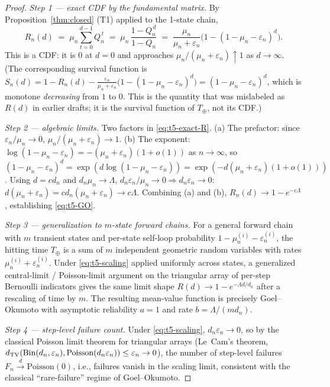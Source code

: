 \iffalse
\begin{proof}
\emph{Step 1 --- exact CDF by the fundamental matrix.}
By Proposition~\ref{thm:closed} (T1) applied to the 1-state chain,
\begin{equation}
R_n(d) \;=\; \mu_n \sum_{t=0}^{d-1} Q_n^{\,t}
\;=\; \mu_n\,\frac{1-Q_n^{\,d}}{1-Q_n}
\;=\; \frac{\mu_n}{\mu_n+\varepsilon_n}\bigl(1-(1-\mu_n-\varepsilon_n)^d\bigr).
\label{eq:t5-exact-R}
\end{equation}
This is a CDF: it is $0$ at $d=0$ and approaches
$\mu_n/(\mu_n+\varepsilon_n)\uparrow 1$ as $d\to\infty$.  (The
corresponding survival function is
$S_n(d) = 1 - R_n(d) - \frac{\varepsilon_n}{\mu_n+\varepsilon_n}
         \bigl(1-(1-\mu_n-\varepsilon_n)^d\bigr)
       = (1-\mu_n-\varepsilon_n)^d$,
which is monotone \emph{decreasing} from $1$ to $0$. This is the
quantity that was mislabeled as $R(d)$ in earlier drafts; it is
the survival function of $T_\oplus$, not its CDF.)

\emph{Step 2 --- algebraic limits.}
Two factors in \eqref{eq:t5-exact-R}.
(a) The prefactor: since $\varepsilon_n/\mu_n\to 0$,
$\mu_n/(\mu_n+\varepsilon_n)\to 1$.
(b) The exponent:
$\log(1-\mu_n-\varepsilon_n) = -(\mu_n+\varepsilon_n)(1+o(1))$ as
$n\to\infty$, so
$(1-\mu_n-\varepsilon_n)^d = \exp(d\log(1-\mu_n-\varepsilon_n))
 = \exp(-d(\mu_n+\varepsilon_n)(1+o(1)))$. Using $d=cd_n$
and $d_n\mu_n\to\Lambda$, $d_n\varepsilon_n/\mu_n\to 0
\Rightarrow d_n\varepsilon_n\to 0$:
$d(\mu_n+\varepsilon_n) = cd_n(\mu_n+\varepsilon_n) \to c\Lambda.$
Combining (a) and (b), $R_n(d) \to 1-e^{-c\Lambda}$, establishing
\eqref{eq:t5-GO}.

\emph{Step 3 --- generalization to $m$-state forward chains.}
For a general forward chain with $m$ transient states and per-state
self-loop probability $1-\mu_n^{(i)}-\varepsilon_n^{(i)}$, the
hitting time $T_\oplus$ is a sum of $m$ independent geometric
random variables with rates $\mu_n^{(i)}+\varepsilon_n^{(i)}$.
Under \eqref{eq:t5-scaling} applied uniformly across states, a
generalized central-limit / Poisson-limit argument on the triangular
array of per-step Bernoulli indicators gives the same limit shape
$R(d)\to 1-e^{-\Lambda d/d_n}$ after a rescaling of time by $m$.
The resulting mean-value function is precisely Goel--Okumoto with
asymptotic reliability $a=1$ and rate $b=\Lambda/(md_n)$.

\emph{Step 4 --- step-level failure count.}
Under \eqref{eq:t5-scaling}, $d_n\varepsilon_n\to 0$, so by the
classical Poisson limit theorem for triangular arrays
(Le~Cam's theorem, $d_{\rm TV}(\mathrm{Bin}(d_n,\varepsilon_n),
\mathrm{Poisson}(d_n\varepsilon_n))\le \varepsilon_n\to 0$), the
number of step-level failures $F_n\xrightarrow{d}\mathrm{Poisson}(0)$,
i.e., failures vanish in the scaling limit, consistent with the
classical ``rare-failure'' regime of Goel--Okumoto.
\end{proof}

